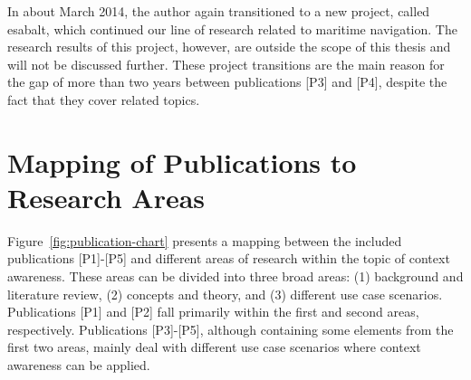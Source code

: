 In about March 2014, the author again transitioned to a new project, called \acrshort{esabalt}, which continued our line of research related to maritime navigation. The research results of this project, however, are outside the scope of this thesis and will not be discussed further. These project transitions are the main reason for the gap of more than two years between publications [P3] and [P4], despite the fact that they cover related topics.

\section{Mapping of Publications to Research Areas}
\label{sec:relating_to_research}

Figure~\ref{fig:publication-chart} presents a mapping between the included publications [P1]-[P5] and different areas of research within the topic of context awareness. These areas can be divided into three broad areas: (1) background and literature review, (2) concepts and theory, and (3) different use case scenarios. Publications [P1] and [P2] fall primarily within the first and second areas, respectively. Publications [P3]-[P5], although containing some elements from the first two areas, mainly deal with different use case scenarios where context awareness can be applied.

